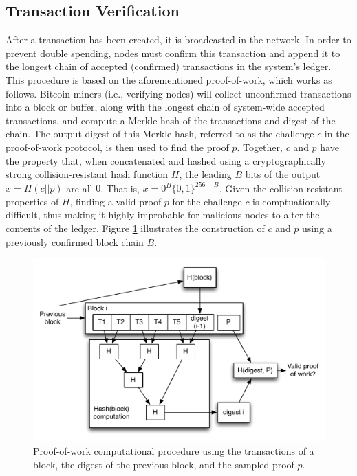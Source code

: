 \subsection{Transaction Verification}

After a transaction has been created, it is broadcasted in the network. In order to prevent double spending, nodes must confirm this transaction and append it to the longest chain of accepted (confirmed) transactions in the system's ledger. This procedure is based on the aforementioned proof-of-work, which works as follows. Bitcoin miners (i.e., verifying nodes) will collect unconfirmed transactions into a block or buffer, along with the longest chain of system-wide accepted transactions, and compute a Merkle hash of the transactions and digest of the chain. The output digest of this Merkle hash, referred to as the challenge $c$ in the proof-of-work protocol, is then used to find the proof $p$. Together, $c$ and $p$ have the property that, when concatenated and hashed using a cryptographically strong collision-resistant hash function $H$, the leading $B$ bits of the output $x = H(c || p)$ are all $0$. That is, $x = 0^B\{0,1\}^{256-B}$. Given the collision resistant properties of $H$, finding a valid proof $p$ for the challenge $c$ is comptuationally difficult, thus making it highly improbable for malicious nodes to alter the contents of the ledger. Figure \ref{fig:pow} illustrates the construction of $c$ and $p$ using a previously confirmed block chain $B$.

\begin{center}
\begin{figure}
\includegraphics[scale=0.5]{./images/transaction_pow.pdf}
\caption{Proof-of-work computational procedure using the transactions of a block, the digest of the previous block, and the sampled proof $p$.}
\label{fig:pow}
\end{figure}
\end{center}


